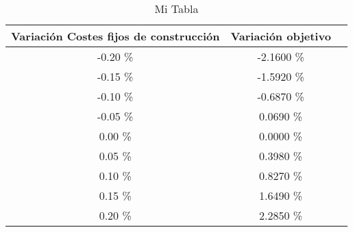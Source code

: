\begin{table}
\centering
\begin{tabular}{|c|c|c|}
\hline
 Variación Costes fijos de construcción & Variación objetivo \\ \hline
-0.20 \% & -2.1600 \% \\ \hline
-0.15 \% & -1.5920 \% \\ \hline
-0.10 \% & -0.6870 \% \\ \hline
-0.05 \% & 0.0690 \% \\ \hline
0.00 \% & 0.0000 \% \\ \hline
0.05 \% & 0.3980 \% \\ \hline
0.10 \% & 0.8270 \% \\ \hline
0.15 \% & 1.6490 \% \\ \hline
0.20 \% & 2.2850 \% \\ \hline
\end{tabular}
\caption{Mi Tabla}
\end{table}

